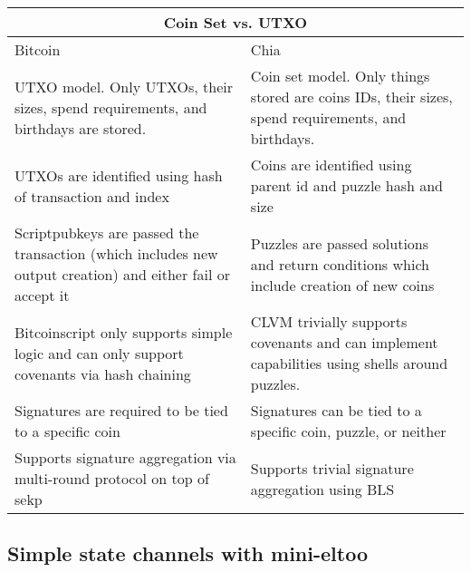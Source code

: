 \documentclass[a4paper]{article}
\begin{document}
\begin{multicols}{2}
\begin{tabular}{ |p{4cm}|p{4cm}|  }
 \hline
 \multicolumn{2}{|c|}{Coin Set vs. UTXO} \\
 \hline
 Bitcoin & Chia\\
 \hline\hline
 UTXO model. Only UTXOs, their sizes, spend requirements, and birthdays are stored. & Coin set model. Only things stored are coins IDs, their sizes, spend requirements, and birthdays.\\
 \hline
 UTXOs are identified using hash of transaction and index & Coins are identified using parent id and puzzle hash and size\\
 \hline
 Scriptpubkeys are passed the transaction (which includes new output creation) and either fail or accept it & Puzzles are passed solutions and return conditions which include creation of new coins\\
 \hline
 Bitcoinscript only supports simple logic and can only support covenants via hash chaining & CLVM trivially supports covenants and can implement capabilities using shells around puzzles.\\
 Signatures are required to be tied to a specific coin & Signatures can be tied to a specific coin, puzzle, or neither\\
 \hline
 Supports signature aggregation via multi-round protocol on top of sekp & Supports trivial signature aggregation using BLS\\
 \hline
\end{tabular}

\subsection{Simple state channels with mini-eltoo}


\end{multicols}
\end{document}
